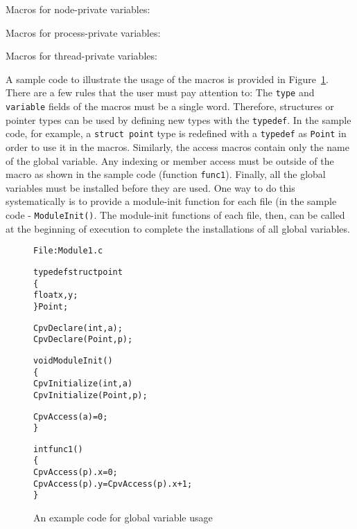 Macros for node-private variables:



Macros for process-private variables:



Macros for thread-private variables:




A sample code to illustrate the usage of the macros is provided
in Figure~\ref{fig:cpv}.
There are a few rules that the user must pay attention to: The
{\tt type} and {\tt variable} fields of the macros must be a single
word. Therefore, structures or pointer types can be used by defining
new types with the {\tt typedef}. In the sample code, for example,
a {\tt struct point} type is redefined with a {\tt typedef} as {\tt Point}
in order to use it in the macros. Similarly,  the access macros contain
only the name of the global variable. Any indexing or member access
must be outside of the macro as shown in the sample code 
(function {\tt func1}). Finally, all the global variables must be
installed before they are used. One way to do this systematically is
to provide a module-init function for each file (in the sample code - 
{\tt ModuleInit()}. The module-init functions of each file, then, can be 
called at the beginning of execution to complete the installations of 
all global variables.

\begin{figure}
\begin{alltt}
File: Module1.c

    typedef struct point
    \{
         float x,y;
    \} Point;


    CpvDeclare(int, a);
    CpvDeclare(Point, p);

    void ModuleInit()
    \{
         CpvInitialize(int, a)
         CpvInitialize(Point, p);

         CpvAccess(a) = 0;
    \}

    int func1() 
    \{
         CpvAccess(p).x = 0;
         CpvAccess(p).y = CpvAccess(p).x + 1;
    \}
\end{alltt}
\caption{An example code for global variable usage}
\label{fig:cpv}
\end{figure}

